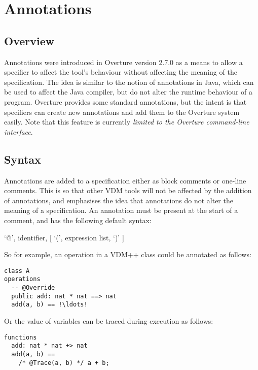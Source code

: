 
\chapter{Annotations}\label{sec:annotations}

\section{Overview}

Annotations were introduced in Overture version 2.7.0 as a means to
allow a specifier to affect the tool’s behaviour without affecting the
meaning of the specification. The idea is similar to the notion of
annotations in Java, which can be used to affect the Java compiler,
but do not alter the runtime behaviour of a program. Overture provides
some standard annotations, but the intent is that specifiers can
create new annotations and add them to the Overture system
easily. Note that this feature is currently \emph{limited to the
  Overture command-line interface}.

\section{Syntax}\label{sec:annotations-syntax}

Annotations are added to a specification either as block comments or
one-line comments. This is so that other VDM tools will not be
affected by the addition of annotations, and emphasises the idea that
annotations do not alter the meaning of a specification. An annotation
must be present at the start of a comment, and has the following
default syntax:

\begin{description}
\item `@', identifier, [ `(', expression list, `)' ]
\end{description}

\noindent So for example, an operation in a VDM++ class could be
annotated as follows:

\begin{lstlisting}[language=VDM++, frame=tlbr,escapechar=!]
class A
operations
  -- @Override
  public add: nat * nat ==> nat
  add(a, b) == !\ldots!
\end{lstlisting}

\noindent Or the value of variables can be traced during execution as
follows:

\begin{lstlisting}[language=VDM++, frame=tlbr]
functions
  add: nat * nat +> nat
  add(a, b) ==
    /* @Trace(a, b) */ a + b;
\end{lstlisting}


